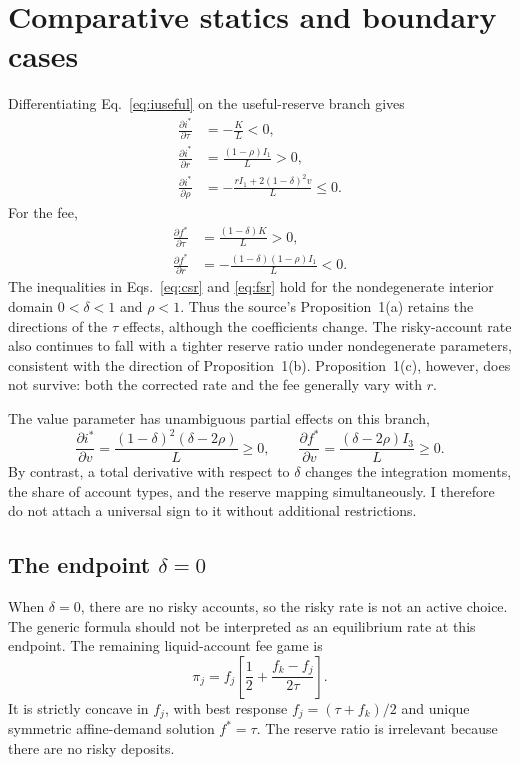 \section{Comparative statics and boundary cases}
Differentiating Eq.~\eqref{eq:iuseful} on the useful-reserve branch gives
\begin{align}
\frac{\partial i^*}{\partial\tau}&=-\frac{K}{L}<0,\label{eq:cstau}\\
\frac{\partial i^*}{\partial r}&=\frac{(1-\rho)I_1}{L}>0,\label{eq:csr}\\
\frac{\partial i^*}{\partial\rho}&=-\frac{rI_1+2(1-\delta)^2v}{L}\le0.\label{eq:csrho}
\end{align}
For the fee,
\begin{align}
\frac{\partial f^*}{\partial\tau}&=\frac{(1-\delta)K}{L}>0,\label{eq:fstau}\\
\frac{\partial f^*}{\partial r}&=-\frac{(1-\delta)(1-\rho)I_1}{L}<0.\label{eq:fsr}
\end{align}
The inequalities in Eqs.~\eqref{eq:csr} and \eqref{eq:fsr} hold for the nondegenerate interior domain $0<\delta<1$ and $\rho<1$. Thus the source's Proposition~1(a) retains the directions of the $\tau$ effects, although the coefficients change. The risky-account rate also continues to fall with a tighter reserve ratio under nondegenerate parameters, consistent with the direction of Proposition~1(b). Proposition~1(c), however, does not survive: both the corrected rate and the fee generally vary with $r$.

The value parameter has unambiguous partial effects on this branch,
\[
\frac{\partial i^*}{\partial v}=\frac{(1-\delta)^2(\delta-2\rho)}{L}\ge0,
\qquad
\frac{\partial f^*}{\partial v}=\frac{(\delta-2\rho)I_3}{L}\ge0.
\]
By contrast, a total derivative with respect to $\delta$ changes the integration moments, the share of account types, and the reserve mapping simultaneously. I therefore do not attach a universal sign to it without additional restrictions.

\subsection{The endpoint $\delta=0$}
When $\delta=0$, there are no risky accounts, so the risky rate is not an active choice. The generic formula should not be interpreted as an equilibrium rate at this endpoint. The remaining liquid-account fee game is
\[
\pi_j=f_j\left[\frac12+\frac{f_k-f_j}{2\tau}\right].
\]
It is strictly concave in $f_j$, with best response $f_j=(\tau+f_k)/2$ and unique symmetric affine-demand solution $f^*=\tau$. The reserve ratio is irrelevant because there are no risky deposits.

